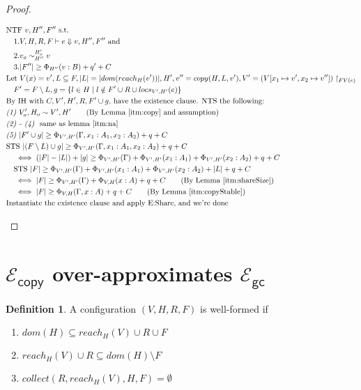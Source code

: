 \documentclass{easychair}
\newcommand{\ms}[1]{\ensuremath{\mathsf{#1}}}
\newcommand{\veq}[4]{#3 \sim^{#1}_{#2} #4}
\newcommand{\gcSem}{\ensuremath{\mathcal{E}_{\ms{gc}}}}
\newcommand{\copySem}{\ensuremath{\mathcal{E}_{\ms{copy}}}}
\theoremstyle{definition}
\newtheorem{definition}{Definition}
\begin{document}
\begin{proof}
\begin{description}
\begin{align*}
  &\text{NTF } v,H'',F'' \text{ s.t. }\\
	&\quad 1. V,H,R,F \vdash e \Downarrow v, H'',F'' \text{ and }\\ 
		&\quad 2. \veq{H_o'}{H''}{v_o}{v}\\
  &\quad 3. |F''| \ge \Phi_{H''}(v:B) + q' + C\\
		&\text{Let } V(x) = v',
  L \subseteq F,
  |L| = |dom(reach_H(v'))|,
  H',v'' = copy(H,L,v'),
	V' = (V[x_1 \mapsto v',x_2 \mapsto v'']) \restriction_{FV(e)}\\
		&\quad F' =	F \setminus L,
		g = \{l \in H \mid l \notin F' \cup R \cup locs_{V',H'}(e)\}\\
		&\text{By IH with } C, V',H',R,F'\cup g \text{, have the existence clause. NTS the following: }\\
		&\emph{(1) } V_o',H_o \sim V',H' \tag{By Lemma~\ref{itm:copy} and assumption}\\
		&\emph{(2) - (4) } \text{ same as lemma~\ref{itm:na}}\\ 
		&\emph{(5) } |F' \cup g| \ge \Phi_{V',H'}(\Gamma,x_1 : A_1,x_2 : A_2) + q + C\\
		&\text{STS } |(F\setminus L) \cup g| \ge \Phi_{V', H'}(\Gamma,x_1 : A_1,x_2 : A_2) + q + C\\
		&\quad \iff (|F| - |L|) + |g| \ge \Phi_{V',H'}(\Gamma) + 
			\Phi_{V',H'}(x_1 : A_1) + \Phi_{V',H'}(x_2 : A_2) + q + C\\
		&\quad \text{STS } |F| \ge \Phi_{V',H'}(\Gamma) + 
			\Phi_{V',H'}(x_1 : A_1) + \Phi_{V',H'}(x_2 : A_2) + |L| + q + C\\
	&\quad \iff |F| \ge \Phi_{V',H'}(\Gamma) + 
			\Phi_{V,H}(x : A) + q + C \tag{By Lemma~\ref{itm:shareSize}}\\
		&\quad \iff |F| \ge \Phi_{V,H}(\Gamma,x:A) + q + C \tag{By Lemma~\ref{itm:copyStable}}\\
		&\text{Instantiate the existence clause and apply E:Share, and we're done}
	\end{align*}
  \end{description}
\end{proof}

\section{\copySem{} over-approximates \gcSem{}}

\begin{definition} A configuration $(V,H,R,F)$ is well-formed if 
	\begin{enumerate}
		\item $dom(H) \subseteq reach_H(V) \cup R \cup F$
		\item $reach_H(V) \cup R \subseteq dom(H) \setminus F$
		\item $collect(R,reach_H(V),H,F) = \emptyset$
	\end{enumerate}
\end{definition}
\end{document}
